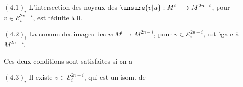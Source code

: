 $(4.1)_i$ L'intersection des noyaux des $\unsure{v|u}:M^i\longrightarrow M^{2n-i}$, pour $v\in\mathcal E_i^{2n-i}$, est réduite à $0$.

$(4.2)_i$ La somme des images des $v:M^i\longrightarrow M^{2n-i}$, pour $v\in\mathcal E_i^{2n-i}$, est  égale à $M^{2n-i}$.

Ces deux conditions sont satisfaites si on a

$(4.3)_i$ Il existe  $v\in\mathcal E_i^{2n-i}$, qui est un isom. de
